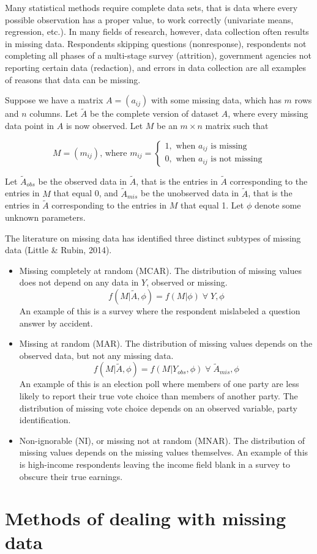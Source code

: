 \documentclass[12pt,twoside]{reedthesis}
\begin{document}
Many statistical methods require complete data sets, that is data where every possible observation has a proper value, to work correctly (univariate means, regression, etc.). In many fields of research, however, data collection often results in missing data. Respondents skipping questions (nonresponse), respondents not completing all phases of a multi-stage survey (attrition), government agencies not reporting certain data (redaction), and errors in data collection are all examples of reasons that data can be missing.

Suppose we have a matrix \(A = (a_{ij})\) with some missing data, which has \(m\) rows and \(n\) columns. Let \(\tilde{A}\) be the complete version of dataset \(A\), where every missing data point in \(A\) is now observed. Let \(M\) be an \(m \times n\) matrix such that

\[
M = (m_{ij}) \text{, where } m_{ij} =
\begin{cases}
1, \text{ when }a_{ij}\text{ is missing}\\
0, \text{ when }a_{ij}\text{ is not missing}
\end{cases}
\]

Let \(\tilde{A}_{obs}\) be the observed data in \(\tilde{A}\), that is the entries in \(\tilde{A}\) corresponding to the entries in \(M\) that equal 0, and \(\tilde{A}_{mis}\) be the unobserved data in \(\tilde{A}\), that is the entries in \(\tilde{A}\) corresponding to the entries in \(M\) that equal 1. Let \(\phi\) denote some unknown parameters.

The literature on missing data has identified three distinct subtypes of missing data (Little \& Rubin, 2014).
\begin{itemize}
\item
  Missing completely at random (MCAR). The distribution of missing values does not depend on any data in \(Y\), observed or missing. \[f(M|\tilde{A},\phi) = f(M|\phi) \;\forall\; Y,\phi\] An example of this is a survey where the respondent mislabeled a question answer by accident.
\item
  Missing at random (MAR). The distribution of missing values depends on the observed data, but not any missing data. \[f(M|\tilde{A},\phi) = f(M|Y_{obs},\phi) \;\forall\; \tilde{A}_{mis},\phi\] An example of this is an election poll where members of one party are less likely to report their true vote choice than members of another party. The distribution of missing vote choice depends on an observed variable, party identification.
\item
  Non-ignorable (NI), or missing not at random (MNAR). The distribution of missing values depends on the missing values themselves. An example of this is high-income respondents leaving the income field blank in a survey to obscure their true earnings.
\end{itemize}
\hypertarget{methods-of-dealing-with-missing-data}{%
\section{Methods of dealing with missing data}\label{methods-of-dealing-with-missing-data}}
\end{document}
